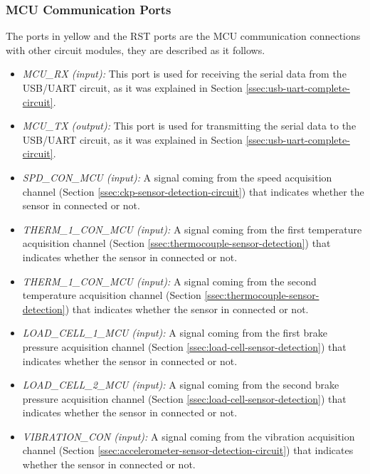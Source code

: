 			\subsubsection{MCU Communication Ports}\label{sssec:mcu-com-ports}
				The ports in yellow and the RST ports are the MCU communication connections with other circuit modules, they are described as it follows.

				\begin{itemize}
					\item \textit{MCU_RX (input):} This port is used for receiving the serial data from the USB/UART circuit, as it was explained in Section \ref{ssec:usb-uart-complete-circuit}.\label{itm:mcu-port-mcu-rx}
					\item \textit{MCU_TX (output):} This port is used for transmitting the serial data to the USB/UART circuit, as it was explained in Section \ref{ssec:usb-uart-complete-circuit}.\label{itm:mcu-port-mcu-tx}
					\item \textit{SPD_CON_MCU (input):} A signal coming from the speed acquisition channel (Section \ref{ssec:ckp-sensor-detection-circuit}) that indicates whether the sensor in connected or not.\label{itm:mcu-port-spd-con-mcu}
					\item \textit{THERM_1_CON_MCU (input):} A signal coming from the first temperature acquisition channel (Section \ref{ssec:thermocouple-sensor-detection}) that indicates whether the sensor in connected or not.\label{itm:mcu-port-therm1-con-mcu}
					\item \textit{THERM_1_CON_MCU (input):} A signal coming from the second temperature acquisition channel (Section \ref{ssec:thermocouple-sensor-detection}) that indicates whether the sensor in connected or not.\label{itm:mcu-port-therm2-con-mcu}
					\item \textit{LOAD_CELL_1_MCU (input):} A signal coming from the first brake pressure acquisition channel (Section \ref{ssec:load-cell-sensor-detection}) that indicates whether the sensor in connected or not.\label{itm:mcu-port-load-cell-1-mcu}
					\item \textit{LOAD_CELL_2_MCU (input):} A signal coming from the second brake pressure acquisition channel (Section \ref{ssec:load-cell-sensor-detection}) that indicates whether the sensor in connected or not.\label{itm:mcu-port-load-cell-2-mcu}
					\item \textit{VIBRATION_CON (input):} A signal coming from the vibration acquisition channel (Section \ref{ssec:accelerometer-sensor-detection-circuit}) that indicates whether the sensor in connected or not.\label{itm:mcu-port-vibration-con}

\end{itemize}
